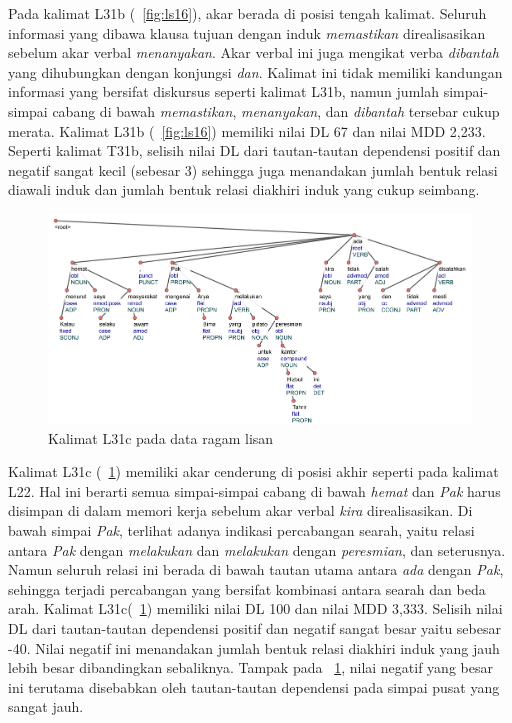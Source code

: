 Pada kalimat L31b (\pic~\ref{fig:ls16}), akar berada di posisi tengah kalimat. Seluruh informasi yang dibawa klausa tujuan dengan induk \textit{memastikan} direalisasikan sebelum akar verbal \textit{menanyakan}. Akar verbal ini juga mengikat verba \textit{dibantah} yang dihubungkan dengan konjungsi \textit{dan}. Kalimat ini tidak memiliki kandungan informasi yang bersifat diskursus seperti kalimat L31b, namun jumlah simpai-simpai cabang di bawah \textit{memastikan}, \textit{menanyakan}, dan \textit{dibantah} tersebar cukup merata. Kalimat L31b (\pic~\ref{fig:ls16}) memiliki nilai DL 67 dan nilai MDD 2,233. Seperti kalimat T31b, selisih nilai DL dari tautan-tautan dependensi positif dan negatif sangat kecil (sebesar 3) sehingga juga menandakan jumlah bentuk relasi diawali induk dan jumlah bentuk relasi diakhiri induk yang cukup seimbang. 

\begin{figure}
	\centering \includegraphics[width=1
	\textwidth] {pics/ls114.jpg} 
	\caption{Kalimat L31c pada data ragam lisan}
	\label{fig:ls114} 
\end{figure}

Kalimat L31c (\pic~\ref{fig:ls114}) memiliki akar cenderung di posisi akhir seperti pada kalimat L22. Hal ini berarti semua simpai-simpai cabang di bawah \textit{hemat} dan \textit{Pak} harus disimpan di dalam memori kerja sebelum akar verbal \textit{kira} direalisasikan. Di bawah simpai \textit{Pak}, terlihat adanya indikasi percabangan searah, yaitu relasi antara \textit{Pak} dengan \textit{melakukan} dan \textit{melakukan} dengan \textit{peresmian}, dan seterusnya. Namun seluruh relasi ini berada di bawah tautan utama antara \textit{ada} dengan \textit{Pak}, sehingga terjadi percabangan yang bersifat kombinasi antara searah dan beda arah. Kalimat L31c(\pic~\ref{fig:ls114}) memiliki nilai DL 100 dan nilai MDD 3,333. Selisih nilai DL dari tautan-tautan dependensi positif dan negatif sangat besar yaitu sebesar -40. Nilai negatif ini menandakan jumlah bentuk relasi diakhiri induk yang jauh lebih besar dibandingkan sebaliknya. Tampak pada \pic~\ref{fig:ls114}, nilai negatif yang besar ini terutama disebabkan oleh tautan-tautan dependensi pada simpai pusat yang sangat jauh.

